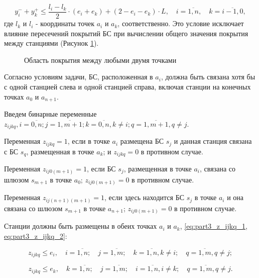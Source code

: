 \begin{equation}
  \label{eq:part3_yi_4}
  y_i^- + y_k^+  \leq \frac{l_i-l_k}{2} \cdot (e_i + e_k) + (2 - e_i - e_k) \cdot L, \quad i = \overline{1,n}, \quad k = \overline{i-1,0},
\end{equation}
где $ l_k $ и $ l_i $ - координаты точек $ a_i $ и $ a_k $, соответственно. Это условие исключает влияние пересечений покрытий БС при вычислении общего значения покрытия между станциями (Рисунок \cref{fig:part3_total_coverage_between_points}).

\begin{figure}[ht]
  \caption{Область покрытия между любыми двумя точками}\label{fig:part3_total_coverage_between_points}
\end{figure}

Согласно условиям задачи, БС, расположенная в $ a_i $, должна быть связана хотя бы с одной станцией слева и одной станцией справа, включая станции на конечных точках $ a_0 $ и $a_{n + 1}$. 

Введем бинарные переменные $z_{ijkq}, i = \overline{0,n}; j= \overline{1,m+1}; k=\overline{0,n},  k \neq i; q= \overline{1,m+1}, q \neq j$.

Переменная $ z_ {ijkq} = 1$, если в точке $ a_i $ размещена БС $ s_j $ и данная станция связана с БС $ s_q $, размещенная в точке $ a_k $; и $ z_ {ijkq} = 0 $ в противном случае.

Переменная $ z_{ij0(m + 1)} = 1$, если БС $ s_j $, размещенная в точке $ a_i $, связана со шлюзом $ s_{m + 1} $ в точке $ a_0 $; $ z_{ij0 (m + 1)} = 0 $ в противном случае.
 
Переменная $ z_{ij(n + 1)(m + 1)} = 1 $, если здесь находится БС $ s_j $ в точке $ a_i $ и она связана со шлюзом $ s_{m + 1} $ в точке $ a_{n + 1} $; $ z_{ij0(m + 1)} = 0 $  в противном случае.

Станции должны быть размещены в обеих точках $ a_i $ и $ a_k $, \cref{eq:part3_z_ijkq_1, eq:part3_z_ijkq_2}:

\begin{equation}
  \label{eq:part3_z_ijkq_1}
  z_{ijkq} \leq e_i , \quad i = \overline{1, n}; \quad j = \overline{1, m}; \quad k = \overline{1,n}, k \neq i; \quad q = \overline{1,m}, q \neq j;
\end{equation}


\begin{equation}
  \label{eq:part3_z_ijkq_2}
  z_{ijkq} \leq e_k , \quad k = \overline{1, n}; \quad j = \overline{1, m}; \quad i = \overline{1,n}, i \neq k; \quad q = \overline{1,m}, q \neq j.
\end{equation}

